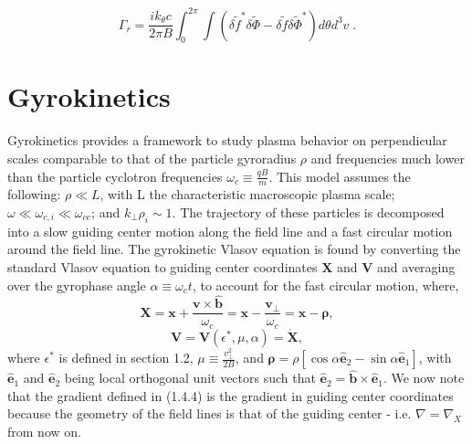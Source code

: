 \documentclass[12pt]{article}
\numberwithin{equation}{subsection}
\begin{document}
   \begin{equation}
      \Gamma_r = \frac{ik_\theta c}{2\pi B}\int_{0}^{2\pi}\int(\delta\widetilde{f}^*\delta\widetilde{\Phi}-\delta\widetilde{f}\delta\widetilde{\Phi}^*)d\theta d^{3}v\;.
   \end{equation}


\section{Gyrokinetics}
   \quad Gyrokinetics provides a framework to study plasma behavior on perpendicular scales comparable to that of the
particle gyroradius $\rho$ and frequencies much lower than the particle cyclotron frequencies $\omega_c \equiv \frac{qB}{m}$. This model assumes
the following: $\rho \ll L$, with L the characteristic macroscopic plasma scale; $\omega \ll \omega_{c,i} \ll \omega_{ce}$;
and $k_\perp \rho_i \sim 1$\cite{GyroKinAstr}. The trajectory of these particles is decomposed into a slow guiding center motion
along the field line and a fast circular motion around the field line. The gyrokinetic Vlasov equation is found by converting the
standard Vlasov equation to guiding center coordinates $\bm{X}$ and $\bm{V}$ and averaging over the gyrophase angle $\alpha
\equiv \omega_c t$, to account for the fast circular motion, where\cite{FriemanChen},
   \begin{equation}
      \bm{X} = \bm{x} + \frac{\bm{v}\times\bm{\hat{b}}}{\omega_c} = \bm{x} - \frac{\bm{v}_\perp}{\omega_c}
             = \bm{x} - \bm{\rho},
   \end{equation}
   \begin{equation}
      \bm{V} = \bm{V}(\epsilon^*, \mu, \alpha) = \dot{\bm{X}},
   \end{equation}
where $\epsilon^*$ is defined in section 1.2, $\mu \equiv \frac{v_\perp^2}{2B}$, and $\bm{\rho} =
\rho[\cos\alpha\bm{\hat{e}}_2 - \sin\alpha\bm{\hat{e}}_1]$, with $\bm{\hat{e}}_1$ and $\bm{\hat{e}}_2$
being local orthogonal unit vectors such that $\bm{\hat{e}}_2=\bm{\hat{b}}\times\bm{\hat{e}}_1$.
We now note that the gradient defined in (1.4.4) is the gradient in guiding center coordinates because
the geometry of the field lines is that of the guiding center - i.e. $\nabla = \nabla_X$ from now on.
\end{document}
